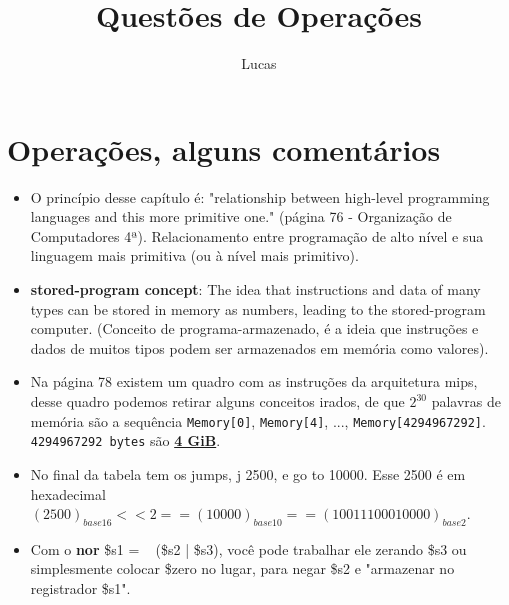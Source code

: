 \documentclass{article}
\author{Lucas}
\title{Questões de Operações}
\begin{document}
\maketitle

\section{Operações, alguns comentários}

\begin{itemize}
\item O princípio desse capítulo é: "relationship between high-level programming
languages and this more primitive one." (página 76 - Organização de Computadores
4ª). Relacionamento entre programação de alto nível e sua linguagem mais 
primitiva (ou à nível mais primitivo).

\item \textbf{stored-program concept}: The idea that instructions and data of 
many types can be stored in memory as numbers, leading to the stored-program 
computer. (Conceito de programa-armazenado, é a ideia que instruções e dados de 
muitos tipos podem ser armazenados em memória como valores).

\item Na página 78 existem um quadro com as instruções da arquitetura mips, 
desse quadro podemos retirar alguns conceitos irados, de que $2^{30}$ palavras 
de memória são a sequência \verb|Memory[0]|, \verb|Memory[4]|, ..., 
\verb|Memory[4294967292]|. \verb|4294967292 bytes| são \textbf{\underline{4 
GiB}}.

\item No final da tabela tem os jumps, j 2500, e go to 10000. Esse 2500 é em 
hexadecimal $(2500)_{base16} << 2 == (10000)_{base10} == 
(10011100010000)_{base2}$.

\item Com o \textbf{nor} \$s1 = ~ (\$s2 | \$s3), você pode trabalhar ele 
zerando \$s3 ou simplesmente colocar \$zero no lugar, para negar \$s2 e 
"armazenar no registrador \$s1".


\end{itemize}
\end{document}
